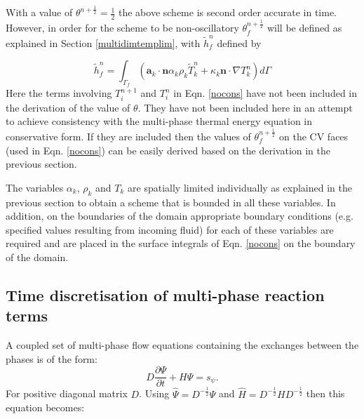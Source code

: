 With a value of $\theta^{n+\frac{1}{2}}={\frac{1}{2}}$ the above scheme is second order accurate in time. However, in order for the scheme to be non-oscillatory $\theta_{f}^{n+\frac{1}{2}}$ will be defined as explained in Section \ref{multidimtemplim}, with $\tilde{h}^{n}_{f}$ defined by

\begin{equation}
\tilde{h}^{n}_{f}=\int_{\Gamma_{f}}
\left(\mathbf{a}_k\cdot \mathbf{n}\alpha_k \rho_k \widetilde{T}^{n}_k
+\kappa_k \mathbf{n}\cdot \nabla  T^{n}_k  \right)d\Gamma
\end{equation}
Here the terms involving $T_i^{n+1}$ and $T_i^n$ in Eqn. \ref{nocons} have not been included in the derivation of the value of $\theta$. They have not been included here in an attempt to achieve consistency with the multi-phase thermal energy equation in conservative form. If they are included then the values of $\theta_f^{n+\frac{1}{2}}$ on the CV faces (used in Eqn. \ref{nocons}) can be easily derived based on the derivation in the previous section.

The variables $\alpha_k$, $\rho_k$ and $T_k$ are spatially limited individually as explained in the previous section to obtain a scheme that is bounded in all these variables. In addition, on the boundaries of the domain appropriate boundary conditions (e.g. specified values resulting from incoming fluid) for each of these variables are required and are placed in the surface integrals of Eqn. \ref{nocons} on the boundary of the domain.


\subsection{Time discretisation of multi-phase reaction terms}
A coupled set of multi-phase flow equations containing the exchanges between the phases is of the form: 
\begin{equation}
D \frac{\partial \Psi}{\partial t} + H \Psi = s_\psi. 
\label{w-rho-e-prob}
\end{equation}
For positive diagonal matrix $D$. Using $\hat \Psi = D^{-\frac{1}{2}} \Psi$ and $\hat H=D^{-\frac{1}{2}} H D^{-\frac{1}{2}}$ then this equation becomes: 

